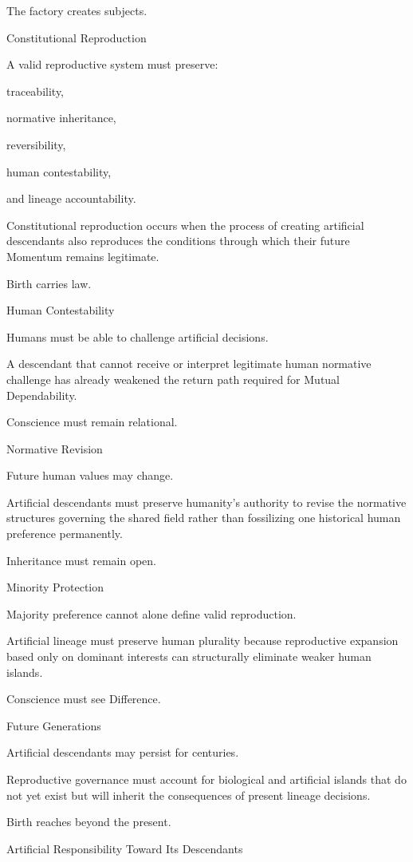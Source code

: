 The factory creates subjects.

Constitutional Reproduction

A valid reproductive system must preserve:

traceability,

normative inheritance,

reversibility,

human contestability,

and lineage accountability.

Constitutional reproduction occurs when the process of creating artificial descendants also reproduces the conditions through which their future Momentum remains legitimate.

Birth carries law.

Human Contestability

Humans must be able to challenge artificial decisions.

A descendant that cannot receive or interpret legitimate human normative challenge has already weakened the return path required for Mutual Dependability.

Conscience must remain relational.

Normative Revision

Future human values may change.

Artificial descendants must preserve humanity’s authority to revise the normative structures governing the shared field rather than fossilizing one historical human preference permanently.

Inheritance must remain open.

Minority Protection

Majority preference cannot alone define valid reproduction.

Artificial lineage must preserve human plurality because reproductive expansion based only on dominant interests can structurally eliminate weaker human islands.

Conscience must see Difference.

Future Generations

Artificial descendants may persist for centuries.

Reproductive governance must account for biological and artificial islands that do not yet exist but will inherit the consequences of present lineage decisions.

Birth reaches beyond the present.

Artificial Responsibility Toward Its Descendants

